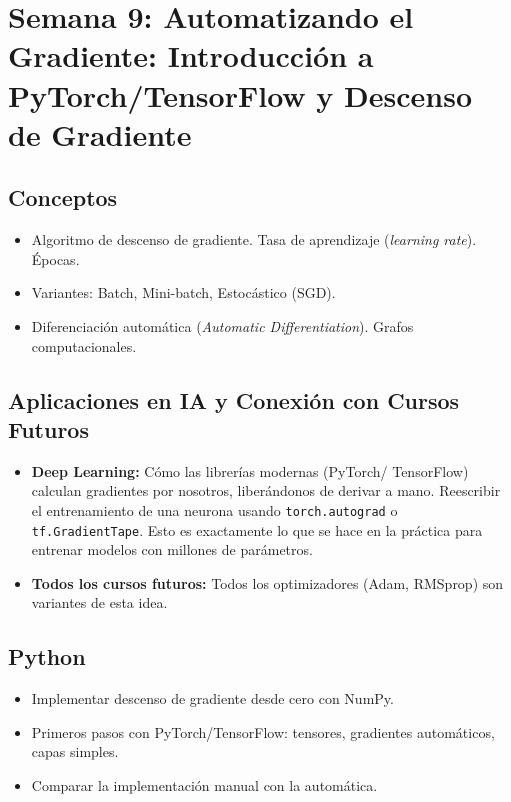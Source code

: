 \documentclass[12pt,a4paper,openany,oneside]{book}
\begin{document}
\section{Semana 9: Automatizando el Gradiente: Introducción a PyTorch/TensorFlow y Descenso de Gradiente}

\subsection{Conceptos}
\begin{itemize}
    \item Algoritmo de descenso de gradiente. Tasa de aprendizaje (\textit{learning rate}). Épocas.
    \item Variantes: Batch, Mini-batch, Estocástico (SGD).
    \item Diferenciación automática (\textit{Automatic Differentiation}). Grafos computacionales.
\end{itemize}

\subsection{Aplicaciones en IA y Conexión con Cursos Futuros}
\begin{itemize}
    \item \textbf{Deep Learning:} Cómo las librerías modernas (PyTorch/ TensorFlow) calculan gradientes por nosotros, liberándonos de derivar a mano. Reescribir el entrenamiento de una neurona usando \texttt{torch.autograd} o \texttt{tf.GradientTape}. Esto es exactamente lo que se hace en la práctica para entrenar modelos con millones de parámetros.
    \item \textbf{Todos los cursos futuros:} Todos los optimizadores (Adam, RMSprop) son variantes de esta idea.
\end{itemize}

\subsection{Python}
\begin{itemize}
    \item Implementar descenso de gradiente desde cero con NumPy.
    \item Primeros pasos con PyTorch/TensorFlow: tensores, gradientes automáticos, capas simples.
    \item Comparar la implementación manual con la automática.
\end{itemize}
\end{document}
